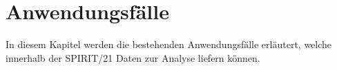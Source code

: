 \chapter{Anwendungsfälle}
In diesem Kapitel werden die bestehenden Anwendungsfälle erläutert, welche innerhalb der SPIRIT/21 Daten zur Analyse liefern können.











